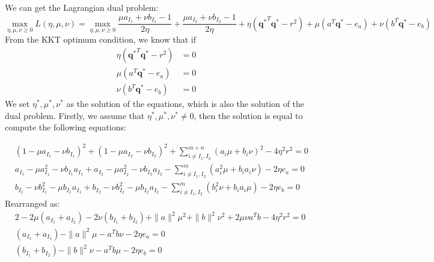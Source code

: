 \documentclass[twoside]{article}
\theoremstyle{plain}
\newcommand{\tranT}{T}
\renewcommand{\vec}[1]{\bm{#1}}
\begin{document}
We can get the Lagrangian dual problem:
\begin{equation}
\max_{\eta,\mu,\nu\geq0} L(\eta,\mu,\nu) = \max_{\eta,\mu,\nu\geq0} \frac{\mu a_{I_1} + \nu b_{I_1}-1}{2\eta} +\frac{\mu a_{I_2} + \nu b_{I_2}-1}{2\eta}+ \eta({\vec{q}^{*}}^{\tranT}\vec{q}^{*}-r^2 )+\mu( a^{\tranT}\vec{q}^{*} - e_a ) + \nu( b^{\tranT}\vec{q}^{*} - e_b )
\end{equation}
From the KKT optimum condition, we know that if
\begin{equation}
\begin{split} 
 \eta ({\vec{q}^{*}}^{\tranT}\vec{q}^{*} -r^2) &= 0\\
 \mu( a^{\tranT}\vec{q}^{*} - e_a)&= 0\\
 \nu(b^{\tranT}\vec{q}^{*} - e_b) &=0
 \end{split}
\end{equation}
We set $\eta^{*}, \mu^{*}, \nu^{*}$ as the solution of the equations, which is also the solution of the dual problem. Firstly, we assume that $\eta^{*}, \mu^{*}, \nu^{*} \neq 0$, then the solution is equal to compute the following equations:

\begin{equation}
\begin{split} 
 & (1-\mu a_{I_1}-\nu b_{I_1})^2 + (1-\mu a_{I_2}-\nu b_{I_2})^2 + \sum^{m+n}_{i\neq I_1,I_2}(a_i\mu+b_i\nu)^2 - 4\eta^2 r^2 = 0 \\
 & a_{I_1}-\mu a_{I_1}^2-\nu b_{I_1}a_{I_1} + a_{I_2}-\mu a_{I_2}^2-\nu b_{I_2}a_{I_2} - \sum^{m}_{i\neq I_1,I_2}(a_i^2\mu +b_i a_i\nu) - 2\eta {e_a} = 0 \\
 & b_{I_1}-\nu b_{I_1}^2-\mu b_{I_1}a_{I_1} + b_{I_2}-\nu b_{I_2}^2-\mu b_{I_2}a_{I_2} - \sum^{m}_{i\neq I_1,I_2}(b_i^2\nu +b_i a_i\mu) - 2\eta {e_b} = 0 
 \end{split}
\end{equation}
Rearranged as:
\begin{equation}
\begin{split} 
 & 2-2\mu (a_{I_1}+a_{I_2})-2\nu(b_{I_1}+b_{I_2})+ \|a\|^2\mu^2+\|b\|^2\nu^2+2\mu\nu a^{\tranT}b - 4\eta^2 r^2 = 0 \\
 & (a_{I_1}+ a_{I_1}) - \|a\|^2\mu - a^{\tranT}b\nu - 2\eta {e_a} = 0 \\
 & (b_{I_1}+ b_{I_2}) - \|b\|^2\nu - a^{\tranT}b \mu - 2\eta {e_b} = 0 
 \end{split}
\end{equation}
\end{document}
